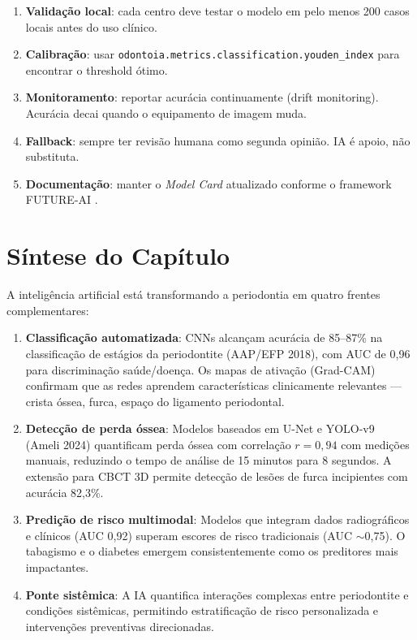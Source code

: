 \begin{enumerate}
    \item \textbf{Validação local}: cada centro deve testar o modelo
    em pelo menos 200 casos locais antes do uso clínico.
    \item \textbf{Calibração}: usar \texttt{odontoia.metrics.classification.youden\_index}
    para encontrar o threshold ótimo.
    \item \textbf{Monitoramento}: reportar acurácia continuamente
    (drift monitoring). Acurácia decai quando o equipamento de
    imagem muda.
    \item \textbf{Fallback}: sempre ter revisão humana como
    segunda opinião. IA é apoio, não substituta.
    \item \textbf{Documentação}: manter o \emph{Model Card} atualizado
    conforme o framework FUTURE-AI \cite{futureai2025}.
\end{enumerate}



\section{Síntese do Capítulo}

A inteligência artificial está transformando a periodontia em quatro frentes complementares:

\begin{enumerate}
    \item \textbf{Classificação automatizada}: CNNs alcançam acurácia de 85--87\% na classificação de estágios da periodontite (AAP/EFP 2018), com AUC de 0,96 para discriminação saúde/doença. Os mapas de ativação (Grad-CAM) confirmam que as redes aprendem características clinicamente relevantes --- crista óssea, furca, espaço do ligamento periodontal.
    
    \item \textbf{Detecção de perda óssea}: Modelos baseados em U-Net e YOLO-v9~\cite{ameli2024} (Ameli 2024) quantificam perda óssea com correlação $r = 0,94$ com medições manuais, reduzindo o tempo de análise de 15 minutos para 8 segundos. A extensão para CBCT 3D permite detecção de lesões de furca incipientes com acurácia 82,3\%.
    
    \item \textbf{Predição de risco multimodal}: Modelos que integram dados radiográficos e clínicos (AUC 0,92) superam escores de risco tradicionais (AUC $\sim$0,75). O tabagismo e o diabetes emergem consistentemente como os preditores mais impactantes.
    
    \item \textbf{Ponte sistêmica}: A IA quantifica interações complexas entre periodontite e condições sistêmicas, permitindo estratificação de risco personalizada e intervenções preventivas direcionadas.
\end{enumerate}

